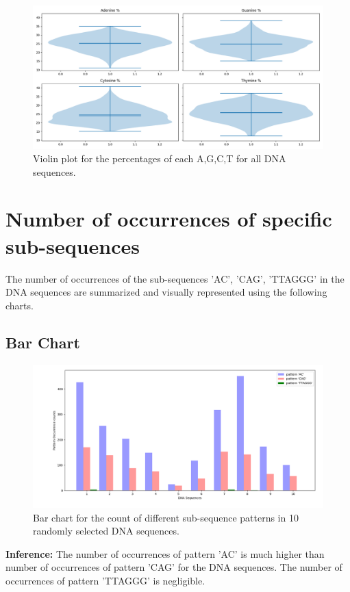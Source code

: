 \documentclass{article}
\begin{document}
			\begin{figure}[!htbp]
				\centering
				\includegraphics[scale=0.4]{charts/Figure_4}
				\caption{Violin plot for the percentages of each A,G,C,T for all DNA sequences.}
			\end{figure}
			
	\section{Number of occurrences of specific sub-sequences}
		The number of occurrences of the sub-sequences 'AC', 'CAG', 'TTAGGG' in the DNA sequences are summarized and visually represented using the following charts.
		
		\subsection{Bar Chart}
		
			\begin{figure}[!htbp]
				\centering
				\includegraphics[scale=0.4]{charts/Figure_5}
				\caption{Bar chart for the count of different sub-sequence patterns in 10 randomly selected DNA sequences.}
			\end{figure}
			
			\textbf{Inference:} The number of occurrences of pattern 'AC' is much higher than number of occurrences of pattern 'CAG' for the DNA sequences. The number of occurrences of pattern 'TTAGGG' is negligible.
		
\end{document}
